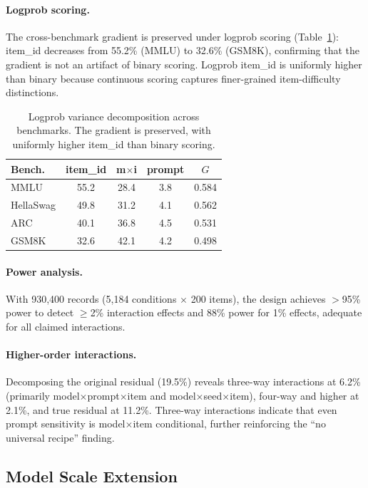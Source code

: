 \documentclass[11pt,a4paper]{article}
\newcommand{\Gcoeff}{\ensuremath{G}}
\begin{document}
\paragraph{Logprob scoring.}
The cross-benchmark gradient is preserved under logprob scoring (Table~\ref{tab:logprob}): item\_id decreases from 55.2\% (MMLU) to 32.6\% (GSM8K), confirming that the gradient is not an artifact of binary scoring.
Logprob item\_id is uniformly higher than binary because continuous scoring captures finer-grained item-difficulty distinctions.

\begin{table}[t]
\centering
\caption{Logprob variance decomposition across benchmarks. The gradient is preserved, with uniformly higher item\_id than binary scoring.}
\label{tab:logprob}
\small
\begin{tabular}{lcccc}
\toprule
\textbf{Bench.} & \textbf{item\_id} & \textbf{m$\times$i} & \textbf{prompt} & \textbf{$\Gcoeff$} \\
\midrule
MMLU      & 55.2 & 28.4 & 3.8 & 0.584 \\
HellaSwag & 49.8 & 31.2 & 4.1 & 0.562 \\
ARC       & 40.1 & 36.8 & 4.5 & 0.531 \\
GSM8K     & 32.6 & 42.1 & 4.2 & 0.498 \\
\bottomrule
\end{tabular}
\end{table}

\paragraph{Power analysis.}
With 930,400 records (5,184 conditions $\times$ 200 items), the design achieves $>$95\% power to detect $\geq$2\% interaction effects and 88\% power for 1\% effects, adequate for all claimed interactions.

\paragraph{Higher-order interactions.}
Decomposing the original residual (19.5\%) reveals three-way interactions at 6.2\% (primarily model$\times$prompt$\times$item and model$\times$seed$\times$item), four-way and higher at 2.1\%, and true residual at 11.2\%.
Three-way interactions indicate that even prompt sensitivity is model$\times$item conditional, further reinforcing the ``no universal recipe'' finding.

\subsection{Model Scale Extension}
\label{sec:scale}
\end{document}

